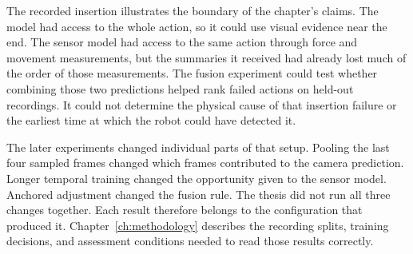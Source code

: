 The recorded insertion illustrates the boundary of the chapter's claims. The model had
access to the whole action, so it could use visual evidence near the end. The sensor
model had access to the same action through force and movement measurements, but the
summaries it received had already lost much of the order of those measurements. The
fusion experiment could test whether combining those two predictions helped rank failed
actions on held-out recordings. It could not determine the physical cause of that
insertion failure or the earliest time at which the robot could have detected it.

The later experiments changed individual parts of that setup. Pooling the last four
sampled frames changed which frames contributed to the camera prediction. Longer
temporal training changed the opportunity given to the sensor model. Anchored adjustment
changed the fusion rule. The thesis did not run all three changes together. Each result
therefore belongs to the configuration that produced it. Chapter~\ref{ch:methodology}
describes the recording splits, training decisions, and assessment conditions needed to
read those results correctly.

